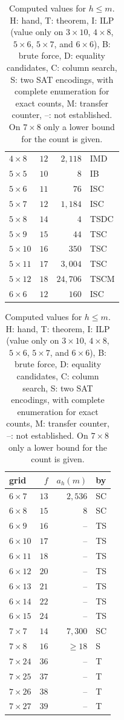 \documentclass[12pt]{article}
\theoremstyle{plain}
\begin{document}
\begin{table}[!htb]
\begin{tabular}{@{}lrrl@{}}
$4\times8$ & $12$ & $2{,}118$ & IMD \\
$5\times5$ & $10$ & $8$ & IB \\
$5\times6$ & $11$ & $76$ & ISC \\
$5\times7$ & $12$ & $1{,}184$ & ISC \\
$5\times8$ & $14$ & $4$ & TSDC \\
$5\times9$ & $15$ & $44$ & TSC \\
$5\times10$ & $16$ & $350$ & TSC \\
$5\times11$ & $17$ & $3{,}004$ & TSC \\
$5\times12$ & $18$ & $24{,}706$ & TSCM \\
$6\times6$ & $12$ & $160$ & ISC \\
\bottomrule
\end{tabular}\hspace{1.5em}
\begin{tabular}{@{}lrrl@{}}
\toprule
grid & $f$ & $a_h(m)$ & by \\
\midrule
$6\times7$ & $13$ & $2{,}536$ & SC \\
$6\times8$ & $15$ & $8$ & SC \\
$6\times9$ & $16$ & -- & TS \\
$6\times10$ & $17$ & -- & TS \\
$6\times11$ & $18$ & -- & TS \\
$6\times12$ & $20$ & -- & TS \\
$6\times13$ & $21$ & -- & TS \\
$6\times14$ & $22$ & -- & TS \\
$6\times15$ & $24$ & -- & TS \\
$7\times7$ & $14$ & $7{,}300$ & SC \\
$7\times8$ & $16$ & $\ge18$ & S \\
$7\times24$ & $36$ & -- & T \\
$7\times25$ & $37$ & -- & T \\
$7\times26$ & $38$ & -- & T \\
$7\times27$ & $39$ & -- & T \\
\bottomrule
\end{tabular}
\caption{Computed values for $h\le m$. H: hand, T: theorem, I: ILP (value only on
$3\times10$, $4\times8$, $5\times6$, $5\times7$, and $6\times6$), B: brute force, D: equality
candidates, C: column search, S: two SAT encodings, with complete enumeration for exact
counts, M: transfer counter,
--: not established. On $7\times8$ only a lower bound for the count is given.}
\label{tab:values}
\end{table}
\end{document}
